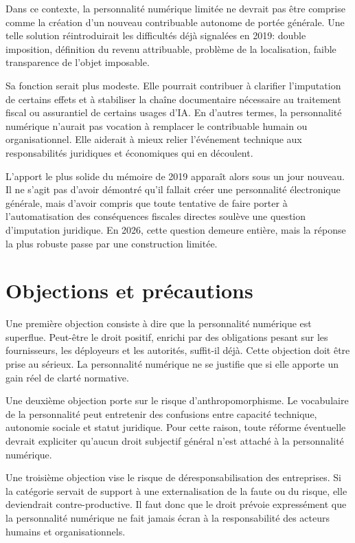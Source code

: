 \documentclass[11pt]{article}
\begin{document}
Dans ce contexte, la personnalité numérique limitée ne devrait pas être comprise comme la création d'un nouveau contribuable autonome de portée générale. Une telle solution réintroduirait les difficultés déjà signalées en 2019: double imposition, définition du revenu attribuable, problème de la localisation, faible transparence de l'objet imposable.

Sa fonction serait plus modeste. Elle pourrait contribuer à clarifier l'imputation de certains effets et à stabiliser la chaîne documentaire nécessaire au traitement fiscal ou assurantiel de certains usages d'IA. En d'autres termes, la personnalité numérique n'aurait pas vocation à remplacer le contribuable humain ou organisationnel. Elle aiderait à mieux relier l'événement technique aux responsabilités juridiques et économiques qui en découlent.

L'apport le plus solide du mémoire de 2019 apparaît alors sous un jour nouveau. Il ne s'agit pas d'avoir démontré qu'il fallait créer une personnalité électronique générale, mais d'avoir compris que toute tentative de faire porter à l'automatisation des conséquences fiscales directes soulève une question d'imputation juridique. En 2026, cette question demeure entière, mais la réponse la plus robuste passe par une construction limitée.

\section{Objections et précautions}
Une première objection consiste à dire que la personnalité numérique est superflue. Peut-être le droit positif, enrichi par des obligations pesant sur les fournisseurs, les déployeurs et les autorités, suffit-il déjà. Cette objection doit être prise au sérieux. La personnalité numérique ne se justifie que si elle apporte un gain réel de clarté normative.

Une deuxième objection porte sur le risque d'anthropomorphisme. Le vocabulaire de la personnalité peut entretenir des confusions entre capacité technique, autonomie sociale et statut juridique. Pour cette raison, toute réforme éventuelle devrait expliciter qu'aucun droit subjectif général n'est attaché à la personnalité numérique.

Une troisième objection vise le risque de déresponsabilisation des entreprises. Si la catégorie servait de support à une externalisation de la faute ou du risque, elle deviendrait contre-productive. Il faut donc que le droit prévoie expressément que la personnalité numérique ne fait jamais écran à la responsabilité des acteurs humains et organisationnels.
\end{document}
